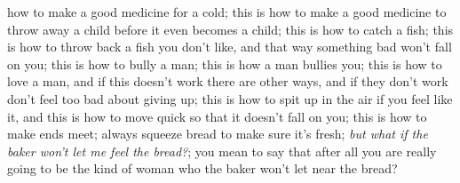 \documentclass[10pt,a4paper]{article}
\begin{document}
how to make a good medicine for a cold; this is how to make a good medicine to throw away a child before it even becomes a child; this is how to catch a fish; this is how to throw back a fish you don’t like, and that way something bad won’t fall on you; this is how to bully a man; this is how a man bullies you; this is how to love a man, and if this doesn’t work there are other ways, and if they don’t work don’t feel too bad about giving up; this is how to spit up in the air if you feel like it, and this is how to move quick so that it doesn’t fall on you; this is how to make ends meet; always squeeze bread to make sure it’s fresh; \emph{but what if the baker won’t let me feel the bread?}; you mean to say that after all you are really going to be the kind of woman who the baker won’t let near the bread?
\end{document}
